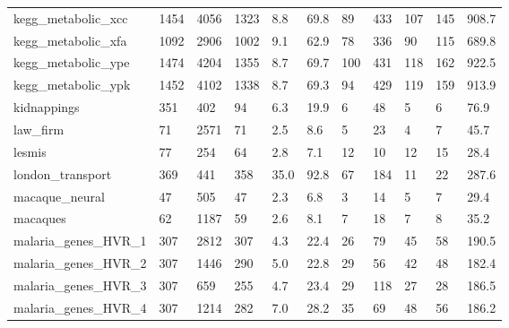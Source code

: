 \begin{longtable}{lllllllllll}
 kegg\_metabolic\_xcc                                 & 1454       & 4056      & 1323  & 8.8    & 69.8   & 89    & 433    & 107    & 145    & 908.7   \\
 kegg\_metabolic\_xfa                                 & 1092       & 2906      & 1002  & 9.1    & 62.9   & 78    & 336    & 90     & 115    & 689.8   \\
 kegg\_metabolic\_ype                                 & 1474       & 4204      & 1355  & 8.7    & 69.7   & 100   & 431    & 118    & 162    & 922.5   \\
 kegg\_metabolic\_ypk                                 & 1452       & 4102      & 1338  & 8.7    & 69.3   & 94    & 429    & 119    & 159    & 913.9   \\
 kidnappings                                        & 351        & 402       & 94    & 6.3    & 19.9   & 6     & 48     & 5      & 6      & 76.9    \\
 law\_firm                                           & 71         & 2571      & 71    & 2.5    & 8.6    & 5     & 23     & 4      & 7      & 45.7    \\
 lesmis                                             & 77         & 254       & 64    & 2.8    & 7.1    & 12    & 10     & 12     & 15     & 28.4    \\
 london\_transport                                   & 369        & 441       & 358   & 35.0   & 92.8   & 67    & 184    & 11     & 22     & 287.6   \\
 macaque\_neural                                     & 47         & 505       & 47    & 2.3    & 6.8    & 3     & 14     & 5      & 7      & 29.4    \\
 macaques                                           & 62         & 1187      & 59    & 2.6    & 8.1    & 7     & 18     & 7      & 8      & 35.2    \\
 malaria\_genes\_HVR\_1                                & 307        & 2812      & 307   & 4.3    & 22.4   & 26    & 79     & 45     & 58     & 190.5   \\
 malaria\_genes\_HVR\_2                                & 307        & 1446      & 290   & 5.0    & 22.8   & 29    & 56     & 42     & 48     & 182.4   \\
 malaria\_genes\_HVR\_3                                & 307        & 659       & 255   & 4.7    & 23.4   & 29    & 118    & 27     & 28     & 186.5   \\
 malaria\_genes\_HVR\_4                                & 307        & 1214      & 282   & 7.0    & 28.2   & 35    & 69     & 48     & 56     & 186.2   \\

\end{longtable}
